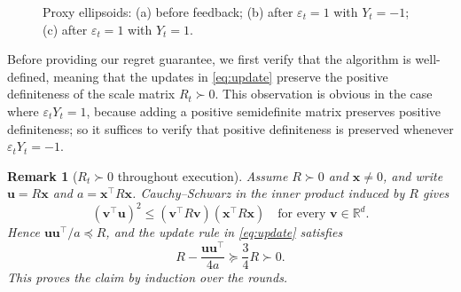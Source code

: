 \documentclass[11pt]{article}
\newtheorem{remark}[theorem]{Remark}
\newcommand{\R}{\mathbb R}
\newcommand{\bm}{\boldsymbol m}
\newcommand{\bx}{\boldsymbol x}
\begin{document}
\begin{figure}[tbp]
\caption{{Proxy ellipsoids: (a) before feedback; (b) after $\varepsilon_t=1$ with $Y_t = -1$; (c) after $\varepsilon_t=1$
with $Y_t = 1$.}}
\label{fig:worst-case-scale-update}
\end{figure}
Before providing our regret guarantee, we first verify that the algorithm is well-defined, {meaning that} the updates in \eqref{eq:update} preserve the positive definiteness of the scale matrix $R_t\succ 0$. This observation is obvious in the case where $\varepsilon_t Y_t = 1$, because {adding a positive semidefinite matrix preserves positive definiteness}; so it suffices to verify that {positive definiteness} is preserved whenever $\varepsilon_t Y_t = - 1$.


\begin{remark}[$R_t\succ 0$ throughout execution]\label{rem:pd}
{Assume $R\succ0$ and $\bx\ne0$, and write $\boldsymbol u=R\bx$ and $a=\bx^\top R\bx$.} Cauchy--Schwarz in the inner product induced by $R$ gives
\[
 (\boldsymbol v^\top\boldsymbol u)^2
 \le(\boldsymbol v^\top R\boldsymbol v)(\bx^\top R\bx)
 \quad\text{for every }\boldsymbol v\in\R^d.
\]
Hence $\boldsymbol u\boldsymbol u^\top/a\preceq R$, and the update rule in \eqref{eq:update} satisfies
\[
 R-\frac{\boldsymbol u\boldsymbol u^\top}{4a}\succeq\frac34R\succ0.
\]
{This proves the claim by induction over the rounds.}
\end{remark}
\end{document}

